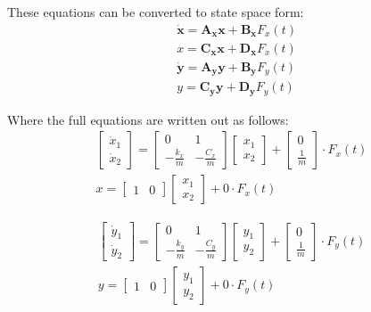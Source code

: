 These equations can be converted to state space form:
\begin{align}
	&\bm{\dot{x}} = \bm{A_x} \bm{x} + \bm{B_x} F_x(t) \\
	&x = \bm{C_x} \bm{x} + \bm{D_x} F_x(t) \\
	&\bm{\dot{y}} = \bm{A_y} \bm{y} + \bm{B_y} F_y(t) \\
	&y = \bm{C_y} \bm{y} + \bm{D_y} F_y(t)
\end{align}

Where the full equations are written out as follows:
\begin{align}
	\begin{bmatrix}
		\dot{x}_1 \\
		\dot{x}_2
	\end{bmatrix} = 		
	\left[\begin{matrix}0 & 1\\- \frac{k_{x}}{m} & - \frac{C_{x}}{m}\end{matrix}\right]
	\left[\begin{matrix}x_{1} \\ x_{2}\end{matrix}\right] +
	\left[\begin{matrix}0 \\ \frac{1}{m}\end{matrix}\right] \cdot F_x(t)\\
	x=
	\begin{bmatrix}
		1 & 0
	\end{bmatrix}
	\begin{bmatrix}
		x_1 \\ x_2		
	\end{bmatrix} + 0 \cdot F_x(t)
\end{align}

\begin{align}
	\begin{bmatrix}
		\dot{y}_1 \\
		\dot{y}_2
	\end{bmatrix} = 		
	\left[\begin{matrix}0 & 1\\- \frac{k_{y}}{m} & - \frac{C_{y}}{m}\end{matrix}\right]
	\left[\begin{matrix}y_{1} \\ y_{2}\end{matrix}\right] +
	\left[\begin{matrix}0 \\ \frac{1}{m}\end{matrix}\right] \cdot F_y(t)\\	
	y=
	\begin{bmatrix}
		1 & 0
	\end{bmatrix}
	\begin{bmatrix}
		y_1 \\ y_2		
	\end{bmatrix} + 0 \cdot F_y(t)	
\end{align}

